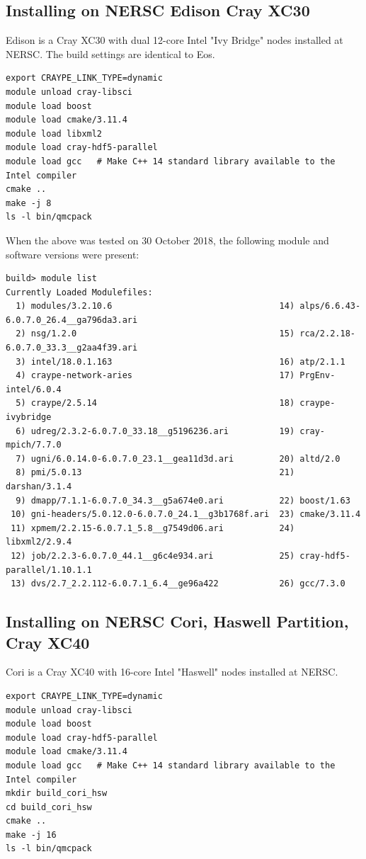 \subsection{Installing on NERSC Edison Cray XC30}

Edison is a Cray XC30 with dual 12-core Intel "Ivy Bridge" nodes
installed at NERSC. The build settings are identical to Eos.

\verbatimfont{\footnotesize}
\begin{verbatim}
export CRAYPE_LINK_TYPE=dynamic
module unload cray-libsci
module load boost
module load cmake/3.11.4
module load libxml2
module load cray-hdf5-parallel
module load gcc   # Make C++ 14 standard library available to the Intel compiler
cmake ..
make -j 8
ls -l bin/qmcpack
\end{verbatim}
When the above was tested on 30 October 2018, the following module and
software versions were present:
\verbatimfont{\footnotesize}
\begin{verbatim}
build> module list
Currently Loaded Modulefiles:
  1) modules/3.2.10.6                                 14) alps/6.6.43-6.0.7.0_26.4__ga796da3.ari
  2) nsg/1.2.0                                        15) rca/2.2.18-6.0.7.0_33.3__g2aa4f39.ari
  3) intel/18.0.1.163                                 16) atp/2.1.1
  4) craype-network-aries                             17) PrgEnv-intel/6.0.4
  5) craype/2.5.14                                    18) craype-ivybridge
  6) udreg/2.3.2-6.0.7.0_33.18__g5196236.ari          19) cray-mpich/7.7.0
  7) ugni/6.0.14.0-6.0.7.0_23.1__gea11d3d.ari         20) altd/2.0
  8) pmi/5.0.13                                       21) darshan/3.1.4
  9) dmapp/7.1.1-6.0.7.0_34.3__g5a674e0.ari           22) boost/1.63
 10) gni-headers/5.0.12.0-6.0.7.0_24.1__g3b1768f.ari  23) cmake/3.11.4
 11) xpmem/2.2.15-6.0.7.1_5.8__g7549d06.ari           24) libxml2/2.9.4
 12) job/2.2.3-6.0.7.0_44.1__g6c4e934.ari             25) cray-hdf5-parallel/1.10.1.1
 13) dvs/2.7_2.2.112-6.0.7.1_6.4__ge96a422            26) gcc/7.3.0

\end{verbatim}

\subsection{Installing on NERSC Cori, Haswell Partition, Cray XC40}
Cori is a Cray XC40 with 16-core Intel "Haswell" nodes
installed at NERSC.

\verbatimfont{\footnotesize}
\begin{verbatim}
export CRAYPE_LINK_TYPE=dynamic
module unload cray-libsci
module load boost
module load cray-hdf5-parallel
module load cmake/3.11.4
module load gcc   # Make C++ 14 standard library available to the Intel compiler
mkdir build_cori_hsw
cd build_cori_hsw
cmake ..
make -j 16
ls -l bin/qmcpack
\end{verbatim}

